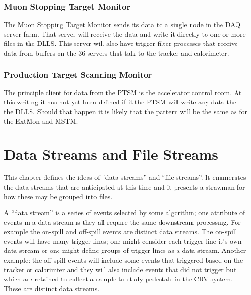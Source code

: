
\subsection{Muon Stopping Target Monitor}
\label{ssec:ExtMon}

The Muon Stopping Target Monitor sends its data to a single node in the DAQ server farm.
That server will receive the data and write it directly to one or more files in
the DLLS.  This server will also have trigger filter processes that receive
data from buffers on the 36 servers that talk to the tracker and calorimeter.

\subsection{Production Target Scanning Monitor}

The principle client for data from the PTSM is the accelerator control room.
At this writing it has not yet been defined if it the PTSM will write any data the the DLLS.
Should that happen it is likely that the pattern will be the same as for the ExtMon
and MSTM.


\chapter{Data Streams and File Streams}
\label{ch:DataStreamsAndFileStreams}

This chapter defines the ideas of ``data streams'' and ``file streams''.
It enumerates the data streams that are anticipated at this time
and it presents a strawman for how these may be grouped into files.


A ``data stream'' is a series of events selected by some algorithm;
one attribute of events in a data stream is they all require the same downstream processing.
For example the on-spill and off-spill events are distinct data streams.
The on-spill events will have many trigger lines; one might consider each trigger
line it's own data stream or one might define groups of trigger lines as a data stream.
Another example: the off-spill events will include some events that triggered based on
the tracker or calorimter and they will also include events that did not trigger but
which are retained to collect a sample to study pedestals in the CRV system.
These are distinct data streams.

